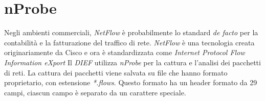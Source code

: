 \documentclass[../main.tex]{subfiles}
\begin{document}
\section{nProbe}

Negli ambienti commerciali, \textit{NetFlow} è probabilmente lo standard \textit{de facto} per la contabilità e la fatturazione del traffico di rete. \textit{NetFlow} è una tecnologia creata originariamente da Cisco e ora è standardizzata come \textit{Internet Protocol Flow Information eXport} \newline
Il \textit{DIEF} utilizza \textit{nProbe} per la cattura e l'analisi dei pacchetti di reti. La cattura dei pacchetti viene salvata su file che hanno formato proprietario, con estensione \textit{*.flows}.
Questo formato ha un header formato da 29 campi, ciascun campo è separato da un carattere speciale.
\end{document}
